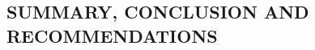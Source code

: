 \begin{doublespace}
	\begin{center}
		\section{\textbf{SUMMARY, CONCLUSION AND RECOMMENDATIONS}}
	\end{center}

	\leavevmode\\
	
	
	

\end{doublespace}
